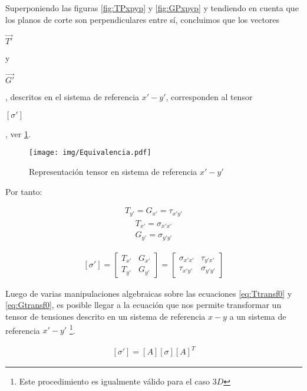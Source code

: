 \documentclass[12pt,letterpaper, twoside, openany]{article}
\begin{document}
Superponiendo las figuras \ref{fig:TPxpyp} y \ref{fig:GPxpyp} y tendiendo en cuenta que los  planos de corte son perpendiculares entre sí, concluimos que los vectores \begin{large} $\overset{\rightarrow}{T'}$\end{large} y \begin{large} $\overset{\rightarrow}{G'}$\end{large}, descritos en el sistema de referencia $x'-y'$, corresponden al tensor \begin{large} $\left[ \sigma' \right]$\end{large}, ver \cref{fig:equiv2D}.
%
\begin{figure}[H]
	\centering
		\texttt{[image: img/Equivalencia.pdf]}
		\caption{Representación tensor en sistema de referencia $x'-y'$}
		\label{fig:equiv2D}
\end{figure}
%
Por tanto:
%
\begin{large}
	\begin{align}
		T_{y'} = G_{x'}=\tau_{x'y'}
	\end{align}
	\begin{align}
		T_{x'}=\sigma_{x'x'}
	\end{align}
	\begin{align}
		G_{y'}=\sigma_{y'y'}
	\end{align}
\end{large}
%
\begin{large}
	\begin{align}
		\left[\sigma'\right]=
		\left[ \begin{array}{cc}
		T_{x'} & G_{x'} \\  
		T_{y'} & G_{y'}
		\end{array}  \right] =
		\left[ \begin{array}{cc}
		\sigma_{x'x'} & \tau_{y'x'} \\  
		\tau_{x'y'} & \sigma_{y'y'}
		\end{array}  \right]
		\label{eq:equiv}
	\end{align}
\end{large}
%
Luego de varias manipulaciones algebraicas sobre las ecuaciones \ref{eq:Ttransf0} y \ref{eq:Gtransf0}, es posible llegar a la ecuación que nos permite transformar un tensor de tensiones descrito en un sistema de referencia $x-y$ a un sistema de referencia $x'-y'$ \footnote{Este procedimiento es igualmente válido para el caso $3D$}.
%
\begin{large}
	\begin{align}
		\left[ \sigma' \right] = \left[ A \right] \left[ \sigma \right] \left[ A \right]^T 
		\label{eq:transforma2Dtensor}
	\end{align}
\end{large}
%
\newpage
\end{document}
